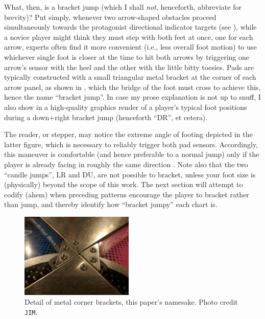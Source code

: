 \documentclass[10pt]{sigplanconf}
\begin{document}

What, then, is a bracket jump (which I shall \textit{not}, henceforth, abbreviate for brevity)?
Put simply, whenever two arrow-shaped obstacles proceed simultaneously towards the protagonist directional indicator targets
(see \cite{turniness}),
while a novice player might think they must step with both feet at once, one for each arrow,
experts often find it more convenient (i.e., less overall foot motion) to use whichever single foot is closer at the time
to hit both arrows by
triggering one arrow's sensor with the heel and the other with the little bitty toesies.
Pads are typically constructed with a small triangular metal bracket at the corner of each arrow panel,
as shown in ,
which the bridge of the foot must cross to achieve this, hence the name ``bracket jump''.
In case my prose explanation is not up to snuff, I also show in 
a high-quality graphics render of a player's typical foot positions during a down+right bracket jump (henceforth ``DR'', et cetera).

The reader, or stepper,
may notice the extreme angle of footing depicted in the latter figure,
which is necessary to reliably trigger both pad sensors.
Accordingly, this maneuver is comfortable (and hence preferable to a normal jump)
only if the player is already facing in roughly the same direction \cite{turniness}.
Note also that the two ``candle jumps'', LR and DU, are not possible to bracket,
unless your foot size is (physically) beyond the scope of this work.
The next section will attempt to codify (ahem) when
preceding patterns encourage the player to bracket rather than jump,
and thereby identify how ``bracket jumpy'' each chart is.

\begin{figure}[t]
	\begin{center}
		\includegraphics[width=0.48\textwidth]{jims-pix.jpg}
	\end{center}
	\caption{Detail of metal corner brackets, this paper's namesake. Photo credit {\tt JIM}.}
	\label{fig:bracker-detail}
\end{figure}
\end{document}
